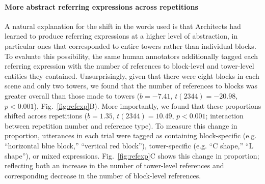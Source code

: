 \documentclass[10pt,letterpaper]{article}
\begin{document}

\paragraph{More abstract referring expressions across repetitions}
A natural explanation for the shift in the words used is that Architects had learned to produce referring expressions at a higher level of abstraction, in particular ones that corresponded to entire towers rather than individual blocks.
To evaluate this possibility, the same human annotators additionally tagged each referring expression with the number of references to block-level and tower-level entities they contained.
Unsurprisingly, given that there were eight blocks in each scene and only two towers, we found that the number of references to blocks was greater overall than those made to towers ($b = -7.41$, $t(2344) = -20.98$, $p<0.001$), Fig.~\ref{fig:refexp}B). 
More importantly, we found that these proportions shifted across repetitions ($b = 1.35$, $t(2344) = 10.49$, $p<0.001$; interaction between repetition number and reference type). To measure this change in proportion, utterances in each trial were tagged as containing block-specific (e.g. ``horizontal blue block,'' ``vertical red block''), tower-specific (e.g. ``C shape,'' ``L shape''), or mixed expressions. Fig.~\ref{fig:refexp}C shows this change in proportion; reflecting both an increase in the number of tower-level references  and corresponding decrease in the number of block-level references. 

\end{document}

